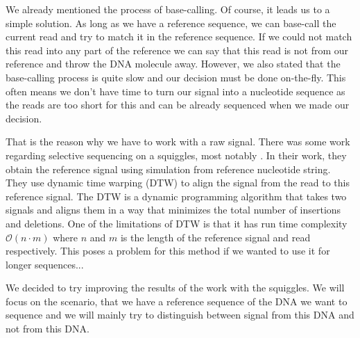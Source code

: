 
We already mentioned the process of base-calling. Of course, it leads us to a simple
solution. As long as we have a reference sequence, we can base-call the current read
and try to match it in the reference sequence. If we could not match this read
into any part of the reference we can say that this read is not from our reference
and throw the DNA molecule away. However, we also stated that the base-calling process
is quite slow and our decision must be done on-the-fly. This often means we don't
have time to turn our signal into a nucleotide sequence as the reads are too short for this
and can be already sequenced when we made our decision.

That is the reason why we have to work with a raw signal. There was some work
regarding selective sequencing on a squiggles, most notably \cite{loose2016real}. In their
work, they obtain the reference signal using simulation from reference nucleotide
string. They use dynamic time warping (DTW) to align the signal from the read to
this reference signal. The DTW is a dynamic programming algorithm that takes two signals and aligns them in a
way that minimizes the total number of insertions and deletions. One of the limitations
of DTW is that it has run time complexity $\mathcal{O}(n\cdot m)$ where $n$ and $m$
is the length of the reference signal and read respectively. This poses a problem
for this method if we wanted to use it for longer sequences...

We decided to try improving the results of the work with the squiggles. We will
focus on the scenario, that we have a reference sequence of the DNA we want to
sequence and we will mainly try to distinguish between signal from this DNA and
not from this DNA.
